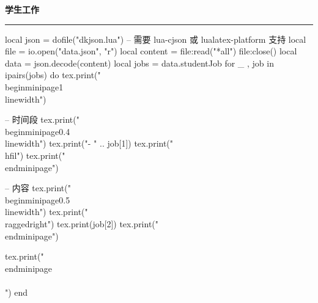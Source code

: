 \documentclass[10pt, a4paper, oneside]{ctexart}
\begin{document}
\ifdefined\studentJob
\begin{minipage}{1\textwidth}
    \large{\textbf{学生工作}}
\end{minipage}
\rule{\linewidth}{\lineSize}
\begin{center}
    \begin{minipage}{0.9\textwidth}
        \begin{luacode}
            local json = dofile("dkjson.lua")  -- 需要 lua-cjson 或 lualatex-platform 支持
            local file = io.open("data.json", "r")
            local content = file:read("*all")
            file:close()
            local data = json.decode(content)
            local jobs = data.studentJob
            for _ , job in ipairs(jobs) do
                tex.print("\\begin{minipage}{1\\linewidth}")

                -- 时间段
                tex.print("\\begin{minipage}{0.4\\linewidth}")
                tex.print("- " .. job[1])
                tex.print("\\hfil")
                tex.print("\\end{minipage}")

                -- 内容
                tex.print("\\begin{minipage}{0.5\\linewidth}")
                tex.print("\\raggedright")
                tex.print(job[2])
                tex.print("\\end{minipage}")

                tex.print("\\end{minipage}\\\\[0.5em]")
            end
        \end{luacode}
    \end{minipage}
\end{center}
\fi
\end{document}
